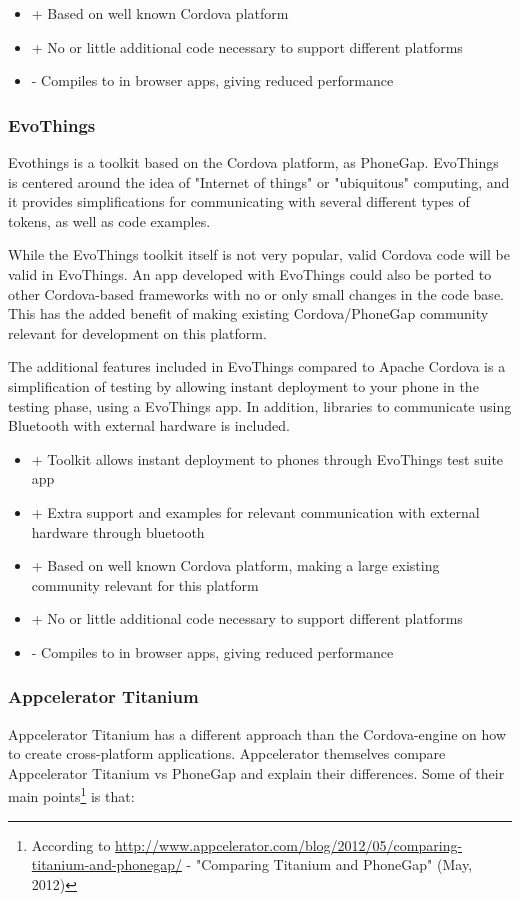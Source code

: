 \begin{itemize}
\item{+ Based on well known Cordova platform}
\item{+ No or little additional code necessary to support different platforms}
\item{- Compiles to in browser apps, giving reduced performance}
\end{itemize}


\subsubsection{EvoThings}
Evothings is a toolkit based on the Cordova platform, as PhoneGap. EvoThings is centered around the idea of "Internet of things" or "ubiquitous" computing, and it provides simplifications for communicating with several different types of tokens, as well as code examples. 

While the EvoThings toolkit itself is not very popular, valid Cordova code will be valid in EvoThings. An app developed with EvoThings could also be ported to other Cordova-based frameworks with no or only small changes in the code base. This has the added benefit of making existing Cordova/PhoneGap community relevant for development on this platform.

The additional features included in EvoThings compared to Apache Cordova is a simplification of testing by allowing instant deployment to your phone in the testing phase, using a EvoThings app. In addition, libraries to communicate using Bluetooth with external hardware is included.

\begin{itemize}
\item{+ Toolkit allows instant deployment to phones through EvoThings test suite app}
\item{+ Extra support and examples for relevant communication with external hardware through bluetooth}
\item{+ Based on well known Cordova platform, making a large existing community relevant for this platform}
\item{+ No or little additional code necessary to support different platforms}
\item{- Compiles to in browser apps, giving reduced performance}
\end{itemize}

\subsubsection{Appcelerator Titanium}
Appcelerator Titanium has a different approach than the Cordova-engine on how to create cross-platform applications. Appcelerator themselves compare Appcelerator Titanium vs PhoneGap and explain their differences. Some of their main points\footnote{According to \href{http://www.appcelerator.com/blog/2012/05/comparing-titanium-and-phonegap/}{http://www.appcelerator.com/blog/2012/05/comparing-titanium-and-phonegap/} - "Comparing Titanium and PhoneGap" (May, 2012)} is that:

